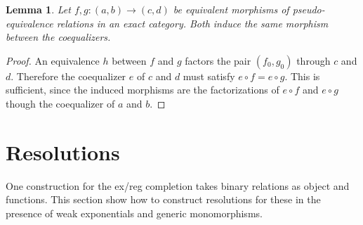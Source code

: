 \documentclass[sort&compress,draft]{elsarticle}
\theoremstyle{plain}
\newtheorem{lemma}[theorem]{Lemma}
\theoremstyle{definition}
\theoremstyle{remark}
\newcommand\hide[1]{}
\newcommand\cat\mathcal
\newcommand\of:
\newcommand\id{\mathrm{id}}
\newcommand\cod{\mathrm{cod}}
\newcommand\di{_!}
\begin{document}
\begin{lemma} Let $f,g\of(a,b)\to(c,d)$ be equivalent morphisms of pseudo-e\-qui\-va\-len\-ce relations in an exact category. Both induce the same morphism between the coequalizers. \label{equivalence implies equality} \end{lemma}

\begin{proof} An equivalence $h$ between $f$ and $g$ factors the pair $(f_0,g_0)$ through $c$ and $d$. Therefore the coequalizer $e$ of $c$ and $d$ must satisfy $e\circ f=e\circ g$. This is sufficient, since the induced morphisms are the factorizations of $e \circ f$ and $e\circ g$ though the coequalizer of $a$ and $b$.
\end{proof}


\hide{\begin{lemma} Let $F\of\cat C\to\cat D$ be a finite limit preserving fully faithful between categories with finite limits and let $\cat D$ be exact. If for each exact $\cat E$ each finite limit preserving functor $G\of\cat C\to\cat E$ has a finite limit preserving left Kan extension $F\di(G)$ along $F$ then $F$ is resolvent. \label{left to resolvent}\end{lemma}

\begin{proof} Define $\cat E$ as follows. Objects are regular epimorphisms $FX\to Y$ in $\cat D$. A morphism $e\to e'$ is a morphism $f\of\cod(e)\to\cod(e')$
such that $f\circ e$ factors through $e'$. This category $\cat E$ is easily proved exact. Let $G\of \cat C\to\cat E$ map $X$ to $\id_{FX}$. This functor preserves finite limits. Any left Kan extension $F\di(G)$ sends each object $D$ of $\cat D$ to a resolvent embedding. Therefore $F$ is resolvent.
\end{proof}}

\hide{ The intuition is equational and essentially algebraic logic. Finite limit preserving functors preserve these.}

\section{Resolutions}

\newcommand\tuple[1]{\langle #1 \rangle}
One construction for the ex/reg completion takes binary relations as object and functions. This section show how to construct resolutions for these in the presence of weak exponentials and generic monomorphisms.
\end{document}
